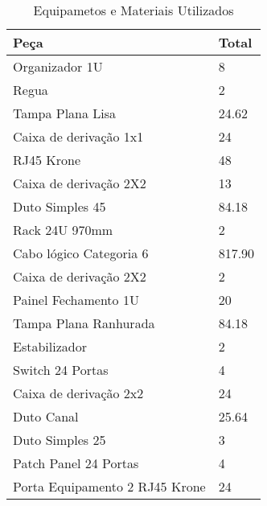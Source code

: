 \begin{table}[]
\centering
\caption{Equipametos e Materiais Utilizados}
\label{equip}
\begin{tabular}{@{}|l|l|@{}}
\toprule
\textbf{Peça}                  & \textbf{Total} \\ \midrule
Organizador 1U                 & 8              \\ \midrule
Regua                          & 2              \\ \midrule
Tampa Plana Lisa               & 24.62          \\ \midrule
Caixa de derivação 1x1         & 24             \\ \midrule
RJ45 Krone                     & 48             \\ \midrule
Caixa de derivação 2X2         & 13             \\ \midrule
Duto Simples 45                & 84.18          \\ \midrule
Rack 24U 970mm                 & 2              \\ \midrule
Cabo lógico Categoria 6        & 817.90         \\ \midrule
Caixa de derivação 2X2         & 2              \\ \midrule
Painel Fechamento 1U           & 20             \\ \midrule
Tampa Plana Ranhurada          & 84.18          \\ \midrule
Estabilizador                  & 2              \\ \midrule
Switch 24 Portas               & 4              \\ \midrule
Caixa de derivação 2x2         & 24             \\ \midrule
Duto Canal                     & 25.64          \\ \midrule
Duto Simples 25                & 3              \\ \midrule
Patch Panel 24 Portas          & 4              \\ \midrule
Porta Equipamento 2 RJ45 Krone & 24             \\ \bottomrule
\end{tabular}
\end{table}